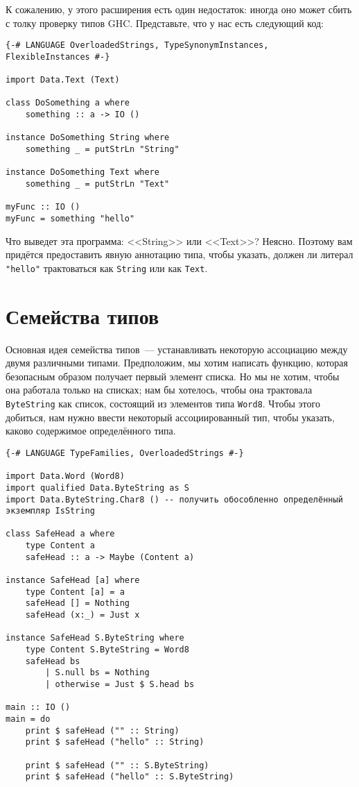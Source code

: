 К сожалению, у этого расширения есть один недостаток: иногда оно может сбить с толку проверку типов GHC. Представьте, что у нас есть следующий код:

\begin{lstlisting}
{-# LANGUAGE OverloadedStrings, TypeSynonymInstances, FlexibleInstances #-}

import Data.Text (Text)

class DoSomething a where
    something :: a -> IO ()

instance DoSomething String where
    something _ = putStrLn "String"

instance DoSomething Text where
    something _ = putStrLn "Text"

myFunc :: IO ()
myFunc = something "hello"
\end{lstlisting}

Что выведет эта программа: <<String>> или <<Text>>? Неясно. Поэтому вам придётся предоставить явную аннотацию типа, чтобы указать, должен ли литерал \lstinline'"hello"' трактоваться как \lstinline'String' или как \lstinline'Text'.

\section{Семейства типов}

Основная идея семейства типов~--- устанавливать некоторую ассоциацию между двумя различными типами. Предположим, мы хотим написать функцию, которая безопасным образом получает первый элемент списка. Но мы не хотим, чтобы она работала только на списках; нам бы хотелось, чтобы она трактовала \lstinline'ByteString' как список, состоящий из элементов типа \lstinline'Word8'. Чтобы этого добиться, нам нужно ввести некоторый ассоциированный тип, чтобы указать, каково содержимое определённого типа.

\begin{lstlisting}
{-# LANGUAGE TypeFamilies, OverloadedStrings #-}

import Data.Word (Word8)
import qualified Data.ByteString as S
import Data.ByteString.Char8 () -- получить обособленно определённый экземпляр IsString

class SafeHead a where
    type Content a
    safeHead :: a -> Maybe (Content a)

instance SafeHead [a] where
    type Content [a] = a
    safeHead [] = Nothing
    safeHead (x:_) = Just x

instance SafeHead S.ByteString where
    type Content S.ByteString = Word8
    safeHead bs
        | S.null bs = Nothing
        | otherwise = Just $ S.head bs

main :: IO ()
main = do
    print $ safeHead ("" :: String)
    print $ safeHead ("hello" :: String)

    print $ safeHead ("" :: S.ByteString)
    print $ safeHead ("hello" :: S.ByteString)
\end{lstlisting}

